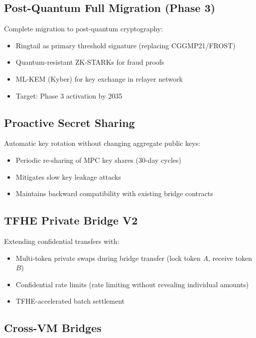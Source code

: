 \documentclass[11pt]{article}
\begin{document}
\subsection{Post-Quantum Full Migration (Phase 3)}

Complete migration to post-quantum cryptography:
\begin{itemize}[leftmargin=1.1em]
  \item Ringtail as primary threshold signature (replacing CGGMP21/FROST)
  \item Quantum-resistant ZK-STARKs for fraud proofs
  \item ML-KEM (Kyber) for key exchange in relayer network
  \item Target: Phase 3 activation by 2035
\end{itemize}

\subsection{Proactive Secret Sharing}

Automatic key rotation without changing aggregate public keys:
\begin{itemize}[leftmargin=1.1em]
  \item Periodic re-sharing of MPC key shares (30-day cycles)
  \item Mitigates slow key leakage attacks
  \item Maintains backward compatibility with existing bridge contracts
\end{itemize}

\subsection{TFHE Private Bridge V2}

Extending confidential transfers with:
\begin{itemize}[leftmargin=1.1em]
  \item Multi-token private swaps during bridge transfer (lock token $A$, receive token $B$)
  \item Confidential rate limits (rate limiting without revealing individual amounts)
  \item TFHE-accelerated batch settlement
\end{itemize}

\subsection{Cross-VM Bridges}
\end{document}
